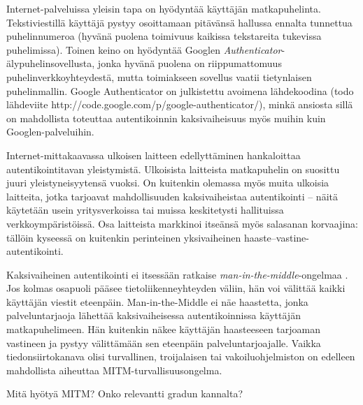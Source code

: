 \documentclass[english,gradu]{tktltiki}
\begin{document}
  Internet-palveluissa yleisin tapa on hyödyntää käyttäjän matkapuhelinta. Tekstiviestillä käyttäjä pystyy osoittamaan pitävänsä hallussa ennalta tunnettua puhelinnumeroa (hyvänä puolena toimivuus kaikissa tekstareita tukevissa puhelimissa). Toinen keino on hyödyntää Googlen \emph{Authenticator}-älypuhelinsovellusta, jonka hyvänä puolena on riippumattomuus puhelinverkkoyhteydestä, mutta toimiakseen sovellus vaatii tietynlaisen puhelinmallin. Google Authenticator on julkistettu avoimena lähdekoodina (todo lähdeviite http://code.google.com/p/google-authenticator/), minkä ansiosta sillä on mahdollista toteuttaa autentikoinnin kaksivaiheisuus myös muihin kuin Googlen-palveluihin.

  Internet-mittakaavassa ulkoisen laitteen edellyttäminen hankaloittaa autentikointitavan yleistymistä. Ulkoisista laitteista matkapuhelin on suosittu juuri yleistyneisyytensä vuoksi. On kuitenkin olemassa myös muita ulkoisia laitteita, jotka tarjoavat mahdollisuuden kaksivaiheistaa autentikointi -- näitä käytetään usein yritysverkoissa tai muissa keskitetysti hallituissa verkkoympäristöissä. Osa laitteista markkinoi itseänsä myös salasanan korvaajina: tällöin kyseessä on kuitenkin perinteinen yksivaiheinen haaste--vastine-autentikointi.

  Kaksivaiheinen autentikointi ei itsessään ratkaise \emph{man-in-the-middle}-ongelmaa \cite{schneier_2factor_2005}.
  Jos kolmas osapuoli pääsee tietoliikenneyhteyden väliin, hän voi välittää kaikki käyttäjän viestit eteenpäin. Man-in-the-Middle ei näe haastetta, jonka palveluntarjaoja lähettää kaksivaiheisessa autentikoinnissa käyttäjän matkapuhelimeen. Hän kuitenkin näkee käyttäjän haasteeseen tarjoaman vastineen ja pystyy välittämään sen eteenpäin palveluntarjoajalle. Vaikka tiedonsiirtokanava olisi turvallinen, troijalaisen tai vakoiluohjelmiston on edelleen mahdollista aiheuttaa MITM-turvallisuusongelma.

  Mitä hyötyä MITM? Onko relevantti gradun kannalta?


\end{document}
